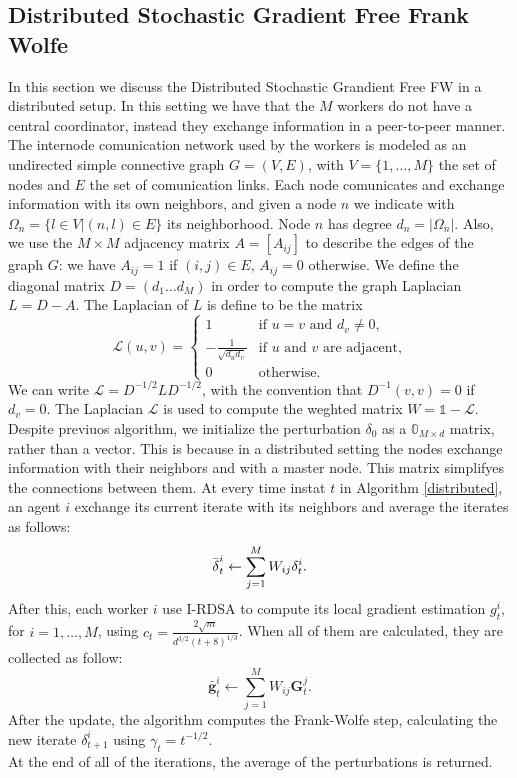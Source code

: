 \subsection{Distributed Stochastic Gradient Free Frank Wolfe}
In this section we discuss the Distributed Stochastic Grandient Free FW in a distributed setup. In this setting we have that the $M$ workers do not have a central coordinator, instead they exchange information in a peer-to-peer manner. The internode comunication network used by the workers is modeled as an undirected simple connective graph $G=(V,E)$, with $V=\{1, \dots, M\}$ the set of nodes and $E$ the set of comunication links. Each node comunicates and exchange information with its own neighbors, and given a node $n$ we indicate with $\Omega_n = \{l \in V | (n,l)\in E\}$ its neighborhood. Node $n$ has degree $d_n = |\Omega_n|$. Also, we use the $M \times M$ adjacency matrix $A=[A_{ij}]$ to describe the edges of the graph $G$: we have $A_{ij}=1$ if $(i,j) \in E$, $A_{ij}=0$ otherwise. We define the diagonal matrix $D=(d_1 \dots d_M)$ in order to compute the graph Laplacian $L=D-A$. The Laplacian of $L$ is define to be the matrix
\[
\mathcal{L}(u,v)=
\begin{cases}
	1 & \text{if $u=v$ and }d_v\ne0, \\
	-\frac{1}{\sqrt{d_ud_v}} & \text{if $u$ and $v$ are adjacent,}\\
	0 & \text{otherwise.}
	
\end{cases}
\]
We can write $\mathcal{L} = D^{-1/2}LD^{-1/2}$, with the convention that $D^{-1}(v,v) = 0$ if $d_v=0$. The Laplacian $\mathcal{L}$ is used to compute the weghted matrix $W = \mathbb{1}- \mathcal{L}$.\\
Despite previuos algorithm, we initialize the perturbation \boldmath$\delta_0$ as a $\mathbb{0}_{M \times d}$ matrix, rather than a vector. This is because in a distributed setting the nodes exchange information with their neighbors and with a master node. This matrix simplifyes the connections between them. At every time instat $t$ in Algorithm \ref{distributed}, an agent $i$ exchange its current iterate with its neighbors and average the iterates as follows:
\[\bar{\text{\boldmath}\delta}_t^i \leftarrow \sum_{j=1}^{M} W_{ij}\text{\boldmath}\delta_t^i.\]
After this, each worker $i$ use I-RDSA to compute its local gradient estimation $g_t^i$, for $i= 1, \dots, M$, using $c_t = \frac{2\sqrt{m}}{d^{3/2}(t+8)^{1/3}}$. When all of them are calculated, they are collected as follow:
\[ \bar{\textbf{g}}_t^i \leftarrow \sum_{j=1}^{M} W_{ij}\textbf{G}_t^j.\]
After the update, the algorithm computes the Frank-Wolfe step, calculating the new iterate \boldmath$\delta_{t+1}^i$ using $\gamma_t= t^{-1/2}$.\\
At the end of all of the iterations, the average of the perturbations is returned.\\

